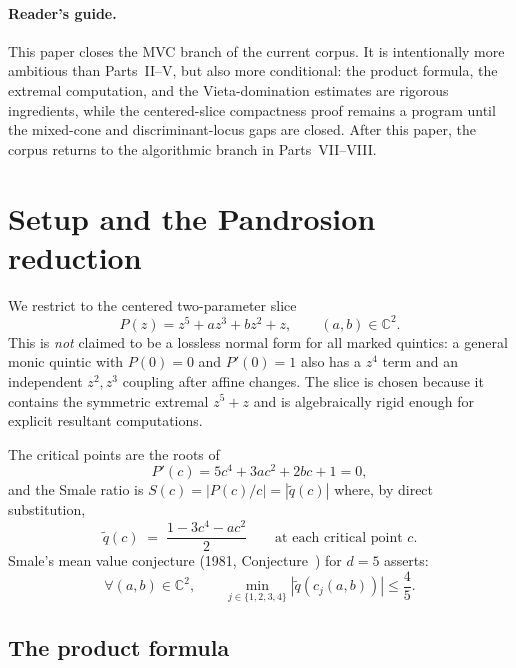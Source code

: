 \documentclass[11pt,a4paper]{article}
\begin{document}
\paragraph{Reader's guide.}
This paper closes the MVC branch of the current corpus. It is intentionally
more ambitious than Parts~II--V, but also more conditional: the product formula,
the extremal computation, and the Vieta-domination estimates are rigorous
ingredients, while the centered-slice compactness proof remains a program until
the mixed-cone and discriminant-locus gaps are closed. After this paper, the
corpus returns to the algorithmic branch in Parts~VII--VIII.

\section{Setup and the Pandrosion reduction}

We restrict to the centered two-parameter slice
\begin{equation}
P(z) = z^5 + a z^3 + b z^2 + z, \qquad (a, b) \in \mathbb{C}^2.
\label{eq:normal-form}
\end{equation}
This is \emph{not} claimed to be a lossless normal form for all marked quintics:
a general monic quintic with $P(0)=0$ and $P'(0)=1$ also has a $z^4$ term and
an independent $z^2,z^3$ coupling after affine changes. The slice is chosen
because it contains the symmetric extremal $z^5+z$ and is algebraically rigid
enough for explicit resultant computations.

The critical points are the roots of
\begin{equation}
P'(c) = 5 c^4 + 3 a c^2 + 2 b c + 1 = 0,
\label{eq:critical-eq}
\end{equation}
and the Smale ratio is $S(c) = |P(c)/c| = |\tilde{q}(c)|$ where, by direct substitution,
\begin{equation}
\boxed{\tilde{q}(c) \;=\; \frac{1 - 3 c^4 - a c^2}{2} \qquad \text{at each critical point } c.}
\label{eq:q-tilde}
\end{equation}
Smale's mean value conjecture (1981, Conjecture~\cite{smale1981}) for $d = 5$ asserts:
\begin{equation}
\forall (a, b) \in \mathbb{C}^2, \qquad \min_{j \in \{1, 2, 3, 4\}} |\tilde{q}(c_j(a, b))| \le \frac{4}{5}.
\label{eq:smale-d5}
\end{equation}

\subsection{The product formula}
\end{document}

